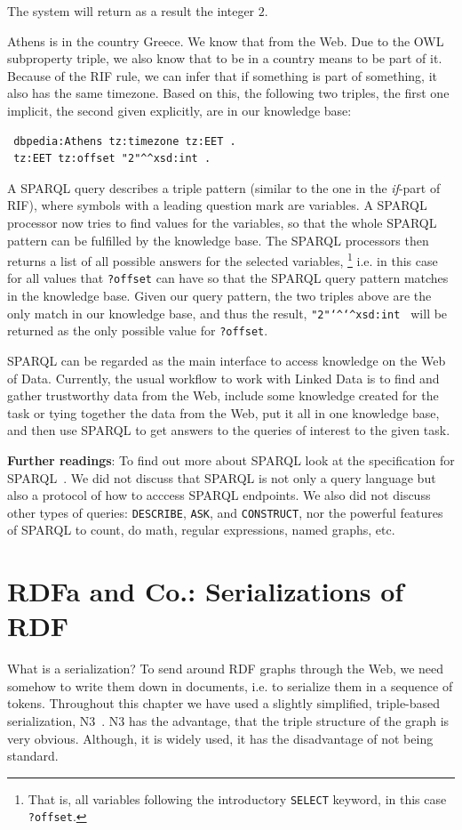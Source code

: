 \documentclass{IOS-Book-Article}
\begin{document}
The system will return as a result the integer $2$.

Athens is in the country Greece. We know that from the Web.
Due to the OWL subproperty triple, we also know that to be in a country means to be part of it.
Because of the RIF rule, we can infer that if something is part of something, it also has the same timezone.
Based on this, the following two triples, the first one implicit, the second given explicitly, are in our knowledge base:

\begin{verbatim}
 dbpedia:Athens tz:timezone tz:EET .
 tz:EET tz:offset "2"^^xsd:int .
\end{verbatim}

A SPARQL query describes a triple pattern (similar to the one in the \textit{if}-part of RIF),
where symbols with a leading question mark are variables.
A SPARQL processor now tries to find values for the variables, so that the whole SPARQL pattern can be fulfilled by the knowledge base.
The SPARQL processors then returns a list of all possible answers for the selected variables,%
\footnote{That is, all variables following the introductory \texttt{SELECT} keyword, in this case \texttt{?offset}.}
i.e. in this case for all values that \texttt{?offset} can have so that the SPARQL query pattern matches in the knowledge base.
Given our query pattern, the two triples above are the only match in our knowledge base, and thus the result, \texttt{"2"\texttt{\char`\^}\texttt{\char`\^}xsd:int } will be returned as the only possible value for \texttt{?offset}.

SPARQL can be regarded as the main interface to access knowledge on the Web of Data.
Currently, the usual workflow to work with Linked Data is to find and gather trustworthy data from the Web, include some knowledge created for the task or tying together the data from the Web, put it all in one knowledge base, and then use SPARQL to get answers to the queries of interest to the given task.

\medskip

\textbf{Further readings}:
To find out more about SPARQL look at the specification for SPARQL~\cite{sparql}.
We did not discuss that SPARQL is not only a query language but also a protocol of how to acccess SPARQL endpoints.
We also did not discuss other types of queries: \texttt{DESCRIBE}, \texttt{ASK}, and \texttt{CONSTRUCT}, nor the powerful features of SPARQL to count, do math, regular expressions, named graphs, etc.

\section{RDFa and Co.: Serializations of RDF}
\label{rdfa}
What is a serialization?
To send around RDF graphs through the Web, we need somehow to write them down in documents, i.e. to serialize them in a sequence of tokens.
Throughout this chapter we have used a slightly simplified, triple-based serialization, N3~\cite{n3}.
N3 has the advantage, that the triple structure of the graph is very obvious.
Although, it is widely used, it has the disadvantage of not being standard.
\end{document}
